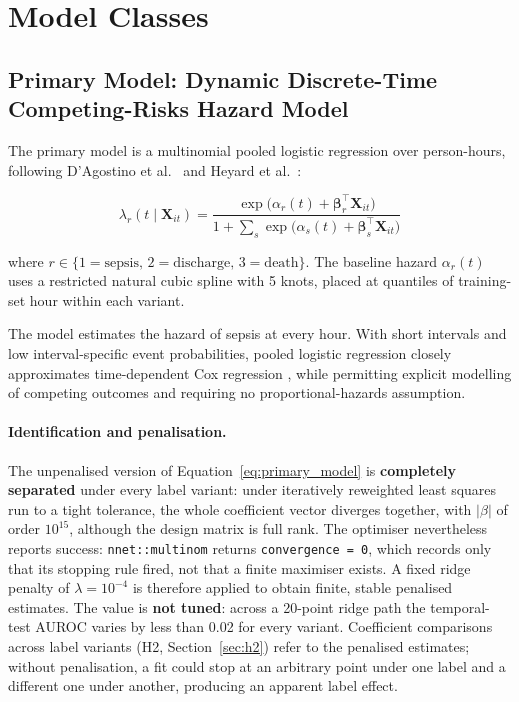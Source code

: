\section{Model Classes}
\label{sec:models}

\subsection[Primary Model: Dynamic Discrete-Time Competing-Risks Hazard Model]%
{Primary Model: Dynamic Discrete-Time Compet\-ing-Risks Hazard Model}
\label{sec:primary_model_spec}

The primary model is a multinomial pooled logistic regression over person-hours,
following D'Agostino et al.\ \cite{dagostino1990pooled} and Heyard et al.\
\cite{heyard2019dynamic}:

\begin{equation}
    \lambda_r(t \mid \mathbf{X}_{it}) =
    \frac{\exp\!\bigl(\alpha_r(t) + \boldsymbol{\beta}_r^\top \mathbf{X}_{it}\bigr)}
    {1 + \sum_{s} \exp\!\bigl(\alpha_s(t) + \boldsymbol{\beta}_s^\top \mathbf{X}_{it}\bigr)}
    \label{eq:primary_model}
\end{equation}

where $r \in \{1=\text{sepsis},\, 2=\text{discharge},\, 3=\text{death}\}$.
The baseline hazard $\alpha_r(t)$ uses a restricted natural cubic spline with
5 knots, placed at quantiles of training-set hour within each variant.

The model estimates the hazard of sepsis at every hour. With short intervals
and low interval-specific event probabilities, pooled logistic regression
closely approximates time-dependent Cox regression
\cite{dagostino1990pooled}, while permitting explicit modelling of competing
outcomes and requiring no proportional-hazards assumption.

\paragraph{Identification and penalisation.}
The unpenalised version of Equation~\eqref{eq:primary_model} is
\textbf{completely separated} under every label variant: under iteratively
reweighted least squares run to a tight tolerance, the whole coefficient vector
diverges together, with $|\beta|$ of order $10^{15}$, although the design
matrix is full rank. The optimiser nevertheless reports success:
\texttt{nnet::multinom} returns \texttt{convergence = 0}, which records only
that its stopping rule fired, not that a finite maximiser exists. A fixed ridge
penalty of $\lambda = 10^{-4}$ is therefore applied to obtain finite, stable
penalised estimates. The value is \textbf{not tuned}: across a 20-point ridge
path the temporal-test AUROC varies by less than 0.02 for every variant.
Coefficient comparisons across label variants (H2, Section~\ref{sec:h2}) refer
to the penalised estimates; without penalisation, a fit could stop at an
arbitrary point under one label and a different one under another, producing
an apparent label effect.

